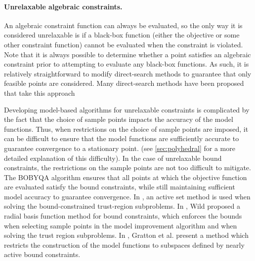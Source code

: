 \paragraph*{Unrelaxable algebraic constraints.}  

 An algebraic constraint function can always be evaluated, so the only way it is considered unrelaxable is if a black-box function (either the objective or some other constraint function) cannot be evaluated when the constraint is violated.
Note that it is always possible to determine whether a point satisfies an algebraic constraint prior to attempting to evaluate any black-box functions.  As such, it is relatively straightforward to modify direct-search methods to guarantee that only feasible points are considered.     
Many direct-search methods have been proposed that take this approach
\cite{box:new, spendley.hext.ea:sequential,may:linearly,may:solving,lewis.torczon:globally,lewis.torczon:direct,
vandenberghen:condor, lewis.torczon:pattern2000,lucidi.sciandrone:derivative-free,chandramouli.narayanan:scaled,kolda.lewis.ea:stationarity,lucidi.sciandrone.ea:objective, 
audet.ledigabel.ea:linear,gratton.royer.ea:direct2019,gratton.royer.ea:direct2015}
%
  
Developing model-based algorithms for unrelaxable constraints is complicated by the fact that the choice of sample points impacts the accuracy of the model functions.     Thus, when restrictions on the choice of sample points are imposed,  it can be difficult to ensure that the model functions are sufficiently accurate to guarantee convergence to a stationary point.    (see \cref{sec:polyhedral} for a more detailed explanation of this difficulty).   In the case of unrelaxable bound constraints, the restrictions on the sample points are not too difficult to mitigate.     The BOBYQA algorithm \cite{powell:BOBYQA} ensures that all points at which the objective function are evaluated satisfy the bound constraints, while still maintaining sufficient model accuracy to guarantee convergence.    In \cite{arouxet.echebest.ea:active-set},  an active set method is used when solving the bound-constrained trust-region subproblems.    In \cite{wild:derivative-free}, Wild proposed a radial basis function method for bound constraints, which enforces the bounds when selecting sample points in the model improvement algorithm and when solving the trust region subproblems.   In \cite{gratton.toint.ea:active-set}, Gratton et al. present a method which restricts the construction of the model functions to subspaces defined by nearly active bound constraints.

